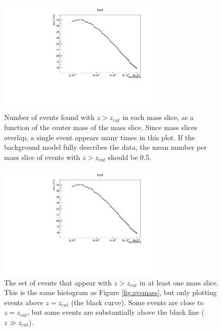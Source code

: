 \begin{figure}[ht]
\begin{center}
    \includegraphics[width=0.7\textwidth,page=8,angle=-90]{vertexing/figs/golden_mres_output}
\end{center}
\caption{Number of events found with $z>z_{cut}$ in each mass slice, as a function of the center mass of the mass slice.
Since mass slices overlap, a single event appears many times in this plot.
If the background model fully describes the data, the mean number per mass slice of events with $z>z_{cut}$ should be 0.5.}
    \label{fig:n_candidates}
\end{figure}

\begin{figure}[ht]
\begin{center}
    \includegraphics[width=0.7\textwidth,page=4,angle=-90]{vertexing/figs/golden_mres_output}
\end{center}
\caption{The set of events that appear with $z>z_{cut}$ in at least one mass slice.
This is the same histogram as Figure \ref{fig:zvsmass}, but only plotting events above $z=z_{cut}$ (the black curve).
Some events are close to $z=z_{cut}$, but some events are substantially above the black line ($z\gg z_{cut}$).}
    \label{fig:zvsmass_candidates}
\end{figure}

